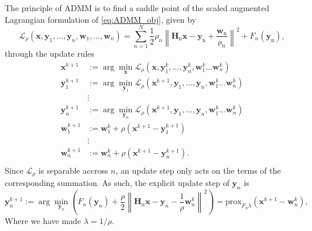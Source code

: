The principle of ADMM is to find a saddle point of the scaled augmented Lagrangian formulation of \eqref{eq:ADMM_obj}, given by
\begin{equation}
    \mathcal{L}_{\rho}(\mathrm{\mathbf{x}},\mathbf{y}_1, …, \mathbf{y}_n,\mathbf{w}_1, …, \mathbf{w}_n) = \sum_{n=1}^N \frac12\rho_n\left\| \mathrm{\mathbf{H}_n\mathbf{x} - \mathbf{y}_n + \frac{\mathbf{w}_n}{\rho_n}}\right\|^2 + F_n(\mathrm{\mathbf{y}_n}),
    \label{eq:scaled_lag}
\end{equation}
through the update rules
\begin{equation}
    \begin{split}
    \mathbf{x}^{k+1} &:= \arg\min_\mathbf{x}\mathcal{L}_{\rho}(\mathbf{x},\mathbf{y}_1^k, …, \mathbf{y}_n^k,\mathbf{w}_1^k…\mathbf{w}_n^k)\\
    \mathbf{y}_1^{k+1} &:= \arg\min_{\mathbf{y}_1}\mathcal{L}_{\rho}(\mathbf{x}^{k+1},\mathbf{y}_1, …, \mathbf{y}_n,\mathbf{w}_1^k…\mathbf{w}_n^k)\\
    &\vdots\\
    \mathbf{y}_n^{k+1} &:= \arg\min_{\mathbf{y}_n}\mathcal{L}_{\rho}(\mathbf{x}^{k+1},\mathbf{y}_1, …, \mathbf{y}_n,\mathbf{w}_1^k…\mathbf{w}_n^k)\\
    \mathbf{w}_1^{k+1} &:= \mathbf{w}_1^k + \rho(\mathbf{x}^{k+1}-\mathbf{y}^{k+1}_1)\\
    &\vdots\\
    \mathbf{w}_n^{k+1} &:= \mathbf{w}_n^k + \rho(\mathbf{x}^{k+1}-\mathbf{y}^{k+1}_n).\\
    \end{split}
    \label{eq:admm_update}
\end{equation}
Since $\mathcal{L}_\rho$ is separable accross $n$, an update step only acts on the terms of the corresponding summation. As such, the explicit update step of $\mathbf{y}_n$ is
\begin{equation}
    \mathbf{y}_n^{k+1} := \arg\min_{\mathbf{y}_n}\left(F_n(\mathbf{y}_n) + \frac{\rho}{2} \left\|\mathbf{H}_n\mathbf{x} - \mathbf{y}_n - \frac{1}{\rho}\mathbf{w}^k_n\right\|^2 \right) = \mathrm{prox}_{ F_n\lambda}(\mathbf{x}^{k+1} - \mathbf{w}^k_n), 
    \label{eq:admm_explicit_update}
\end{equation}
Where we have made $\lambda = 1/\rho$. 

